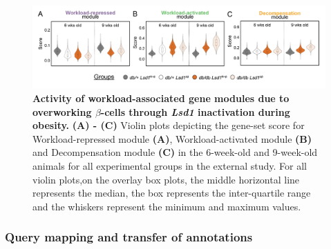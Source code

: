 \begin{figure}[t!]
    \centering
    \includegraphics[width=\linewidth]{Chapter5/Fig/F3-17-01.png}
    \caption[Activity of workload-associated gene modules in the external study]{\textbf{Activity of workload-associated gene modules due to overworking $\beta$-cells through \textit{Lsd1} inactivation during obesity.} \textbf{(A) - (C)} Violin plots depicting the gene-set score for Workload-repressed module \textbf{(A)}, Workload-activated module \textbf{(B)} and Decompensation module \textbf{(C)} in the 6-week-old and 9-week-old animals for all experimental groups in the external study. For all violin plots,on the overlay box plots, the middle horizontal line represents the median, the box represents the inter-quartile range and the whiskers represent the minimum and maximum values.}
    \label{fig:chp3_valid_study_genescores}
\end{figure}

\subsubsection{\large Query mapping and transfer of annotations}

